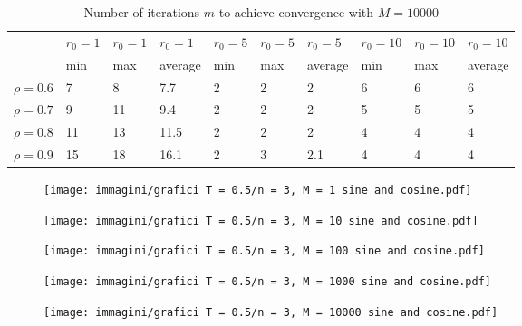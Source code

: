 \documentclass[a4paper,11pt,openright]{report}
\begin{document}
\begin{table}[H]
\centering
\addtolength{\leftskip}{-1.5cm}
\addtolength{\rightskip}{-1.5cm}
\begin{tabular}{|c|lllllllll|}
\hline
$ $ & $r_0 = 1$ & $r_0 = 1$ & $r_0 = 1$ & $r_0 = 5$ & $r_0 = 5$ & $r_0 = 5$ & $r_0 = 10$ & $r_0 = 10$ & $r_0 = 10$  \\
$ $ & min & max & average & min & max & average & min & max & average \\ 
\hline
$\rho = 0.6$ & 7 & 8 & 7.7 & 2 & 2 & 2 & 6 & 6 & 6\\

$\rho = 0.7$ & 9 & 11 & 9.4 & 2 & 2 & 2 & 5 & 5 & 5\\

$\rho = 0.8$ & 11 & 13 & 11.5 & 2 & 2 & 2 & 4 & 4 & 4\\

$\rho = 0.9$ & 15 & 18 & 16.1 & 2 & 3 & 2.1 & 4 & 4 & 4\\
\hline
\end{tabular}
\caption{Number of iterations $m$ to achieve convergence with $M = 10000$}
\end{table}
\begin{figure}[H]
\centering
\texttt{[image: immagini/grafici T = 0.5/n = 3, M = 1 sine and cosine.pdf]}
\end{figure}
\begin{figure}[H]
\centering
\texttt{[image: immagini/grafici T = 0.5/n = 3, M = 10 sine and cosine.pdf]}
\end{figure}
\begin{figure}[H]
\centering
\texttt{[image: immagini/grafici T = 0.5/n = 3, M = 100 sine and cosine.pdf]}
\end{figure}
\begin{figure}[H]
\centering
\texttt{[image: immagini/grafici T = 0.5/n = 3, M = 1000 sine and cosine.pdf]}
\end{figure}
\begin{figure}[H]
\centering
\texttt{[image: immagini/grafici T = 0.5/n = 3, M = 10000 sine and cosine.pdf]}
\end{figure}
\newpage
\end{document}
